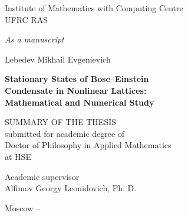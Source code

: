 \documentclass[candidate, href, colorlinks]{disser}
\begin{document}
\begin{titlepage}
\thispagestyle{empty}
\enlargethispage{1cm}
\vspace*{-2cm}

\begin{center}
	Institute of Mathematics with Computing Centre \\ UFRC RAS
\end{center}

\vskip1cm
	
\begin{flushright}
	\emph{As a manuscript}
\end{flushright}
	
\vskip3cm

\begin{center}
	{\large Lebedev Mikhail Evgenievich}
	\vskip1cm
	{\Large\bfseries Stationary States of Bose--Einstein \\ Condensate in Nonlinear Lattices: \\ Mathematical and Numerical Study\par}
	\vskip1.5cm
	{SUMMARY OF THE THESIS \\ submitted for academic degree of \\ Doctor of Philosophy in Applied Mathematics \\ at HSE}
\end{center}

\vskip2cm

\hspace{8cm}\begin{minipage}{0.45\linewidth}
	Academic supervisor \\
	Alfimov Georgy Leonidovich, Ph. D.
\end{minipage}

\vfill

\begin{center}
	{Moscow -- \the\year}
\end{center}

\normalfont\clearpage
\end{titlepage}
\end{document}
